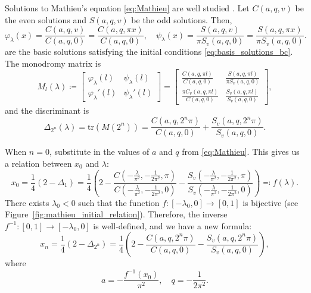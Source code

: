 \documentclass[a4paper]{article}
\theoremstyle{definition}
\numberwithin{equation}{section}
\numberwithin{theorem}{section}
\newcommand{\tr}{\mathrm{tr}}
\begin{document}
{Solutions to Mathieu's equation \eqref{eq:Mathieu} are well studied  \cite{wolf2009mathieu}. Let $C(a,q,v)$ be the even solutions and $S(a,q,v)$ be the odd solutions. Then,
\begin{equation*}
    \varphi_\lambda(x) = \frac{C(a,q,v)}{C(a,q,0)} = \frac{C(a,q,\pi x)}{C(a,q,0)},\quad
    \psi_\lambda(x) = \frac{S(a,q,v)}{\pi S_v(a,q,0)} = \frac{S(a,q,\pi x)}{\pi S_v(a,q,0)}.
\end{equation*}
are the basic solutions satisfying the initial conditions \eqref{eq:basis_solutions_bc}. The monodromy matrix is
\begin{equation*}
    M_l(\lambda)\coloneq\begin{bmatrix}
\varphi_\lambda(l) & \psi_\lambda(l) \\
\varphi_\lambda'(l) & \psi_\lambda'(l) 
\end{bmatrix}
= \begin{bmatrix}
\frac{C(a,q,\pi l)}{C(a,q,0)} & \frac{S(a,q,\pi l)}{\pi S_v(a,q,0)} \\
\frac{\pi C_v(a,q,\pi l)}{C(a,q,0)} & \frac{S_v(a,q,\pi l)}{S_v(a,q,0)}
\end{bmatrix},
\end{equation*}
and the discriminant is
\begin{equation*}
    \Delta_{2^n}(\lambda) = \tr(M(2^n)) = \frac{C(a,q,2^n\pi)}{C(a,q,0)} + \frac{S_v(a,q,2^n\pi)}{S_v(a,q,0)}.
\end{equation*}

When $n=0$, substitute in the values of $a$ and $q$ from \eqref{eq:Mathieu}. This gives us a relation between $x_0$ and $\lambda$:
\begin{equation} \label{eq:mathieu_initial_relation}
    x_0 = \frac{1}{4}(2-\Delta_1) = \frac{1}{4}\left(2-\frac{C(-\frac{\lambda}{\pi^2},-\frac{1}{2\pi^2},\pi)}{C(-\frac{\lambda}{\pi^2},-\frac{1}{2\pi^2},0)} - \frac{S_v(-\frac{\lambda}{\pi^2},-\frac{1}{2\pi^2},\pi)}{S_v(-\frac{\lambda}{\pi^2},-\frac{1}{2\pi^2},0)}\right) \eqcolon f(\lambda).
\end{equation}
There exists $\lambda_0<0$ such that the function $f:[-\lambda_0,0]\rightarrow[0,1]$ is bijective (see Figure~\ref{fig:mathieu_initial_relation}). Therefore, the inverse $f^{-1}:[0,1]\rightarrow[-\lambda_0,0]$ is well-defined, and we have a new formula:
\begin{equation*}
    x_n = \frac{1}{4}(2-\Delta_{2^n}) = \frac{1}{4}\left(2-\frac{C(a,q,2^n\pi)}{C(a,q,0)} - \frac{S_v(a,q,2^n\pi)}{S_v(a,q,0)}\right),
\end{equation*}
where
\begin{equation*}
    a=-\frac{f^{-1}(x_0)}{\pi^2}, \quad q=-\frac{1}{2\pi^2}.
\end{equation*}

}
\end{document}
